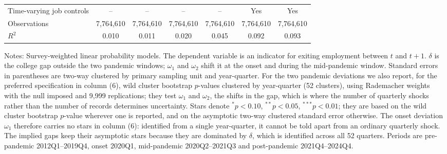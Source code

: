 \begin{table}[H]
\begin{threeparttable}
\begin{tabular}{lcccccc}
Time-varying job controls & -- & -- & -- & -- & Yes & Yes \\
\addlinespace
Observations & 7,764,610 & 7,764,610 & 7,764,610 & 7,764,610 & 7,764,610 & 7,764,610 \\
$R^2$ & 0.010 & 0.011 & 0.020 & 0.045 & 0.092 & 0.093 \\
\bottomrule
\end{tabular}
\begin{tablenotes}[flushleft]\footnotesize
\item Notes: Survey-weighted linear probability models. The dependent variable is an indicator for exiting employment between $t$ and $t+1$. $\delta$ is the college gap outside the two pandemic windows; $\omega_1$ and $\omega_2$ shift it at the onset and during the mid-pandemic window. Standard errors in parentheses are two-way clustered by primary sampling unit and year-quarter. For the two pandemic deviations we also report, for the preferred specification in column (6), wild cluster bootstrap $p$-values clustered by year-quarter (52 clusters), using Rademacher weights with the null imposed and 9,999 replications; they test $\omega_1$ and $\omega_2$, the shifts in the gap, which is where the number of quarterly shocks rather than the number of records determines uncertainty. Stars denote $^{*}p<0.10$, $^{**}p<0.05$, $^{***}p<0.01$; they are based on the wild cluster bootstrap $p$-value wherever one is reported, and on the asymptotic two-way clustered standard error otherwise. The onset deviation $\omega_1$ therefore carries no stars in column (6): identified from a single year-quarter, it cannot be told apart from an ordinary quarterly shock. The implied gaps keep their asymptotic stars because they are dominated by $\delta$, which is identified across all 52 quarters. Periods are pre-pandemic 2012Q1--2019Q4, onset 2020Q1, mid-pandemic 2020Q2--2021Q3 and post-pandemic 2021Q4--2024Q4.
\end{tablenotes}
\end{threeparttable}
\end{table}
